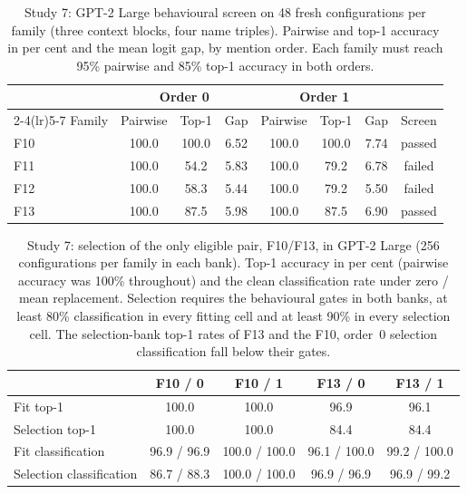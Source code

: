 \begin{table}[H]
\centering\footnotesize
\setlength{\tabcolsep}{3pt}
\caption{Study 7: GPT-2 Large behavioural screen on 48 fresh configurations per family (three context blocks, four name triples). Pairwise and top-1 accuracy in per cent and the mean logit gap, by mention order. Each family must reach 95\% pairwise and 85\% top-1 accuracy in both orders.}
\label{tab:large-screen}
\begin{tabular}{@{}lccccccc@{}}
\toprule
 & \multicolumn{3}{c}{Order 0} & \multicolumn{3}{c}{Order 1} & \\
\cmidrule(lr){2-4}\cmidrule(lr){5-7}
Family & Pairwise & Top-1 & Gap & Pairwise & Top-1 & Gap & Screen \\
\midrule
F10 & 100.0 & 100.0 & 6.52 & 100.0 & 100.0 & 7.74 & passed \\
F11 & 100.0 & 54.2 & 5.83 & 100.0 & 79.2 & 6.78 & failed \\
F12 & 100.0 & 58.3 & 5.44 & 100.0 & 79.2 & 5.50 & failed \\
F13 & 100.0 & 87.5 & 5.98 & 100.0 & 87.5 & 6.90 & passed \\
\bottomrule
\end{tabular}
\end{table}

\begin{table}[H]
\centering\footnotesize
\setlength{\tabcolsep}{4pt}
\caption{Study 7: selection of the only eligible pair, F10/F13, in GPT-2 Large (256 configurations per family in each bank). Top-1 accuracy in per cent (pairwise accuracy was 100\% throughout) and the clean classification rate under zero / mean replacement. Selection requires the behavioural gates in both banks, at least 80\% classification in every fitting cell and at least 90\% in every selection cell. The selection-bank top-1 rates of F13 and the F10, order~0 selection classification fall below their gates.}
\label{tab:large-selection}
\begin{tabular}{@{}lcccc@{}}
\toprule
 & F10 / 0 & F10 / 1 & F13 / 0 & F13 / 1 \\
\midrule
Fit top-1 & 100.0 & 100.0 & 96.9 & 96.1 \\
Selection top-1 & 100.0 & 100.0 & 84.4 & 84.4 \\
Fit classification & 96.9 / 96.9 & 100.0 / 100.0 & 96.1 / 100.0 & 99.2 / 100.0 \\
Selection classification & 86.7 / 88.3 & 100.0 / 100.0 & 96.9 / 96.9 & 96.9 / 99.2 \\
\bottomrule
\end{tabular}
\end{table}
